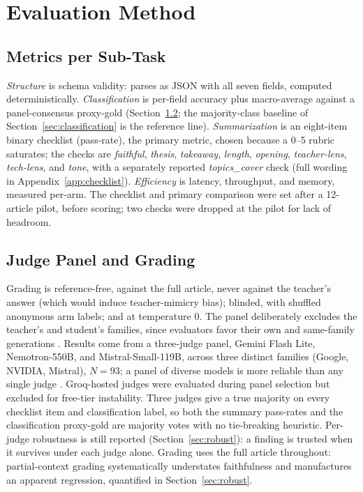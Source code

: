 \documentclass[10pt,journal]{IEEEtran}
\begin{document}
\section{Evaluation Method}\label{sec:eval}
\subsection{Metrics per Sub-Task}
\emph{Structure} is schema validity: parses as JSON with all seven fields, computed deterministically. \emph{Classification} is per-field accuracy plus macro-average against a panel-consensus proxy-gold (Section~\ref{sec:judges}; the majority-class baseline of Section~\ref{sec:classification} is the reference line). \emph{Summarization} is an eight-item binary checklist (pass-rate), the primary metric, chosen because a 0--5 rubric saturates; the checks are \emph{faithful}, \emph{thesis}, \emph{takeaway}, \emph{length}, \emph{opening}, \emph{teacher-lens}, \emph{tech-lens}, and \emph{tone}, with a separately reported \emph{topics\_cover} check (full wording in Appendix~\ref{app:checklist}). \emph{Efficiency} is latency, throughput, and memory, measured per-arm. The checklist and primary comparison were set after a 12-article pilot, before scoring; two checks were dropped at the pilot for lack of headroom.

\subsection{Judge Panel and Grading}\label{sec:judges}
Grading is reference-free, against the full article, never against the teacher's answer (which would induce teacher-mimicry bias); blinded, with shuffled anonymous arm labels; and at temperature 0. The panel deliberately excludes the teacher's and student's families, since evaluators favor their own and same-family generations \cite{panickssery2024, wataoka2024}. Results come from a three-judge panel, Gemini Flash Lite, Nemotron-550B, and Mistral-Small-119B, across three distinct families (Google, NVIDIA, Mistral), $N=93$; a panel of diverse models is more reliable than any single judge \cite{verga2024poll}. Groq-hosted judges were evaluated during panel selection but excluded for free-tier instability. Three judges give a true majority on every checklist item and classification label, so both the summary pass-rates and the classification proxy-gold are majority votes with no tie-breaking heuristic. Per-judge robustness is still reported (Section~\ref{sec:robust}): a finding is trusted when it survives under each judge alone. Grading uses the full article throughout: partial-context grading systematically understates faithfulness and manufactures an apparent regression, quantified in Section~\ref{sec:robust}.
\end{document}

